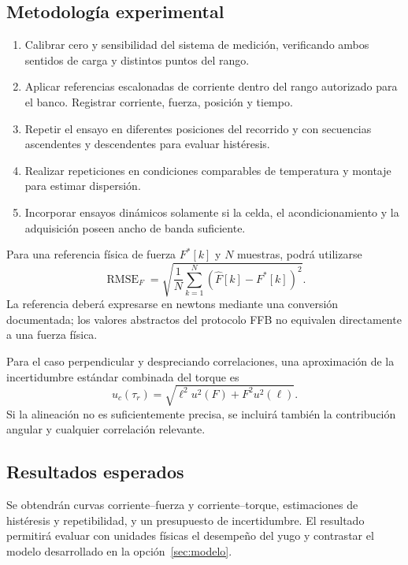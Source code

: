 \documentclass[11pt,a4paper]{article}
\begin{document}
\subsection{Metodología experimental}
\begin{enumerate}
    \item Calibrar cero y sensibilidad del sistema de medición, verificando
    ambos sentidos de carga y distintos puntos del rango.
    \item Aplicar referencias escalonadas de corriente dentro del rango
    autorizado para el banco. Registrar corriente, fuerza, posición y tiempo.
    \item Repetir el ensayo en diferentes posiciones del recorrido y con
    secuencias ascendentes y descendentes para evaluar histéresis.
    \item Realizar repeticiones en condiciones comparables de temperatura
    y montaje para estimar dispersión.
    \item Incorporar ensayos dinámicos solamente si la celda, el
    acondicionamiento y la adquisición poseen ancho de banda suficiente.
\end{enumerate}

Para una referencia física de fuerza $F^*[k]$ y $N$ muestras, podrá utilizarse
\begin{equation}
    \operatorname{RMSE}_F =
    \sqrt{\frac{1}{N}\sum_{k=1}^{N}
    \left(\widehat F[k]-F^*[k]\right)^2}.
\end{equation}
La referencia deberá expresarse en newtons mediante una conversión
documentada; los valores abstractos del protocolo FFB no equivalen
directamente a una fuerza física.

Para el caso perpendicular y despreciando correlaciones, una aproximación
de la incertidumbre estándar combinada del torque es
\begin{equation}
    u_c(\tau_r)=\sqrt{\ell^2u^2(F)+F^2u^2(\ell)}.
\end{equation}
Si la alineación no es suficientemente precisa, se incluirá también la
contribución angular y cualquier correlación relevante.

\subsection{Resultados esperados}
Se obtendrán curvas corriente--fuerza y corriente--torque, estimaciones de
histéresis y repetibilidad, y un presupuesto de incertidumbre. El resultado
permitirá evaluar con unidades físicas el desempeño del yugo y contrastar
el modelo desarrollado en la opción~\ref{sec:modelo}.
\end{document}
